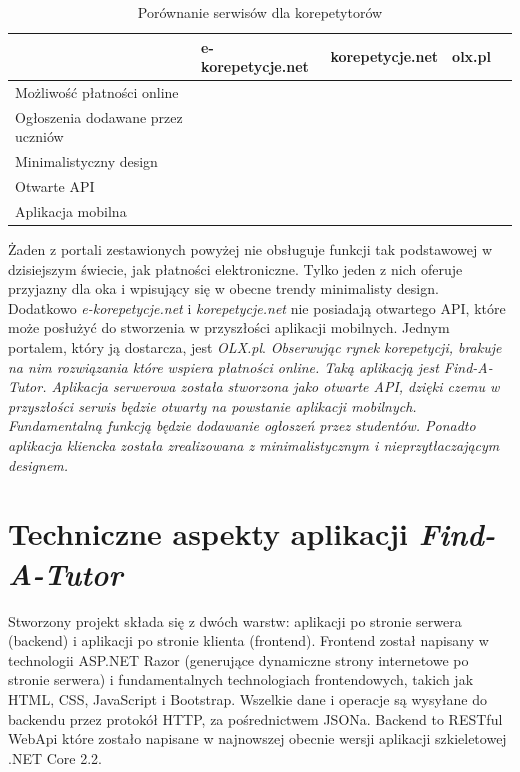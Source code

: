 \documentclass[12pt]{article}
\newcommand{\cmark}{\textcolor{green!80!black}{\ding{51}}}
\newcommand{\xmark}{\textcolor{red}{\ding{55}}}
\numberwithin{figure}{section}
\begin{document}
\begin{sloppypar}
\begin{table}[H]
    \begin{tabular}{|p{5cm}|c|c|c|c|}
    \hline
     & \multicolumn{1}{l|}{e-korepetycje.net} & \multicolumn{1}{l|}{korepetycje.net} & \multicolumn{1}{l|}{olx.pl} \\ \hline
    Możliwość płatności online & \xmark & \xmark & \xmark \\ \hline
    Ogłoszenia dodawane przez uczniów & \cmark & \xmark & \cmark \\ \hline
    Minimalistyczny design & \cmark & \xmark & \xmark \\ \hline
    Otwarte API & \xmark & \xmark & \xmark \\ \hline
    Aplikacja mobilna & \xmark & \xmark & \cmark \\ \hline
    \end{tabular}
    \caption{Porównanie serwisów dla korepetytorów}
    \label{tab:korepetycje}
\end{table}

Żaden z portali zestawionych powyżej nie obsługuje funkcji tak podstawowej w dzisiejszym świecie, jak płatności elektroniczne. Tylko jeden z nich oferuje przyjazny dla oka i wpisujący się w obecne trendy minimalisty design. Dodatkowo \textit{e-korepetycje.net} i \textit{korepetycje.net} nie posiadają otwartego API, które może posłużyć do stworzenia w przyszłości aplikacji mobilnych. Jednym portalem, który ją dostarcza, jest \textit{OLX.pl}.
\newline
\newline
\textit{Obserwując rynek korepetycji, brakuje na nim rozwiązania które wspiera płatności online. Taką aplikacją jest Find-A-Tutor. Aplikacja serwerowa została stworzona jako otwarte API, dzięki czemu w przyszłości serwis będzie otwarty na powstanie aplikacji mobilnych. Fundamentalną funkcją będzie dodawanie ogłoszeń przez studentów. Ponadto aplikacja kliencka została zrealizowana z minimalistycznym i nieprzytłaczającym designem.}

\section{Techniczne aspekty aplikacji \textit{Find-A-Tutor}} \label{tech-aspect}
Stworzony projekt składa się z dwóch warstw: 
aplikacji po stronie serwera (backend) i aplikacji po stronie klienta (frontend).
Frontend został napisany w technologii ASP.NET Razor (generujące dynamiczne strony internetowe po stronie serwera) i fundamentalnych technologiach frontendowych, takich jak HTML, CSS, JavaScript i Bootstrap. Wszelkie dane i operacje są wysyłane do backendu przez protokół HTTP, za pośrednictwem JSONa. 
Backend to RESTful WebApi które zostało napisane w najnowszej obecnie wersji aplikacji szkieletowej .NET Core 2.2.


\end{sloppypar}
\end{document}
